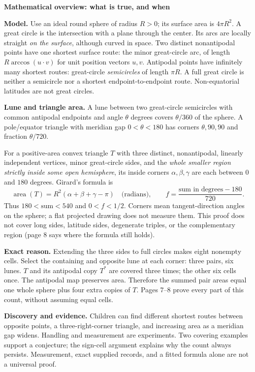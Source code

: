 \documentclass[11pt,letterpaper]{article}
\newcommand{\topic}[1]{\par{\large\bfseries\color{blue}#1}\par}
\begin{document}
\topic{Mathematical overview: what is true, and when}
\textbf{Model.} Use an ideal round sphere of radius $R>0$; its surface area is $4\pi R^2$. A great circle is the intersection with a plane through the center. Its arcs are locally straight \emph{on the surface}, although curved in space. Two distinct nonantipodal points have one shortest surface route: the minor great-circle arc, of length $R\arccos(u\cdot v)$ for unit position vectors $u,v$. Antipodal points have infinitely many shortest routes: great-circle \emph{semicircles} of length $\pi R$. A full great circle is neither a semicircle nor a shortest endpoint-to-endpoint route. Non-equatorial latitudes are not great circles.

\textbf{Lune and triangle area.} A lune between two great-circle semicircles with common antipodal endpoints and angle $\theta$ degrees covers $\theta/360$ of the sphere. A pole/equator triangle with meridian gap $0<\theta<180$ has corners $\theta,90,90$ and fraction $\theta/720$.

For a positive-area convex triangle $T$ with three distinct, nonantipodal, linearly independent vertices, minor great-circle sides, and the \emph{whole smaller region strictly inside some open hemisphere}, its inside corners $\alpha,\beta,\gamma$ are each between $0$ and $180$ degrees. Girard's formula is
\[
  \operatorname{area}(T)=R^2(\alpha+\beta+\gamma-\pi)\quad\text{(radians)},
  \qquad f=\frac{\text{sum in degrees}-180}{720}.
\]
Thus $180<\text{sum}<540$ and $0<f<1/2$. Corners mean tangent-direction angles on the sphere; a flat projected drawing does not measure them. This proof does not cover long sides, latitude sides, degenerate triples, or the complementary region (page 8 says where the formula still holds).

\textbf{Exact reason.} Extending the three sides to full circles makes eight nonempty cells. Select the containing and opposite lune at each corner: three pairs, six lunes. $T$ and its antipodal copy $T^*$ are covered three times; the other six cells once. The antipodal map preserves area. Therefore the summed pair areas equal one whole sphere plus four extra copies of $T$. Pages 7--8 prove every part of this count, without assuming equal cells.

\textbf{Discovery and evidence.} Children can find different shortest routes between opposite points, a three-right-corner triangle, and increasing area as a meridian gap widens. Handling and measurement are experiments. Two covering examples support a conjecture; the sign-cell argument explains why the count always persists. Measurement, exact supplied records, and a fitted formula alone are not a universal proof.
\end{document}
